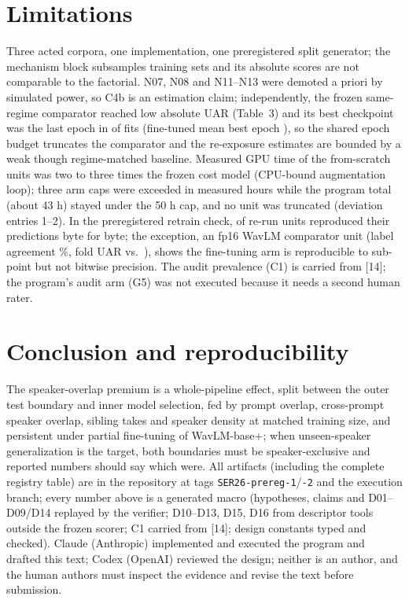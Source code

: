 \documentclass{article}
\begin{document}
\section{Limitations}
Three acted corpora, one implementation, one preregistered split generator; the mechanism block subsamples training sets and its absolute scores are not comparable to the factorial.
N07, N08 and N11--N13 were demoted a priori by simulated power, so C4b is an estimation claim; independently, the frozen same-regime comparator reached low absolute UAR (Table~3) and its best checkpoint was the last epoch in \DFtFrozenBestLast{} of \DFtFrozenTotal{} fits (fine-tuned mean best epoch \DFtFtMeanBest), so the shared epoch budget truncates the comparator and the re-exposure estimates are bounded by a weak though regime-matched baseline.
Measured GPU time of the from-scratch units was two to three times the frozen cost model (CPU-bound augmentation loop); three arm caps were exceeded in measured hours while the program total (about 43 h) stayed under the 50 h cap, and no unit was truncated (deviation entries 1--2).
In the preregistered retrain check, \DRetrainIdentical{} of \DRetrainTotal{} re-run units reproduced their predictions byte for byte; the exception, an fp16 WavLM comparator unit (label agreement \DRetrainAgree\%, fold UAR \DRetrainUarMain{} vs.\ \DRetrainUarCheck), shows the fine-tuning arm is reproducible to sub-point but not bitwise precision.
The audit prevalence (C1) is carried from [14]; the program's audit arm (G5) was not executed because it needs a second human rater.

\section{Conclusion and reproducibility}
The speaker-overlap premium is a whole-pipeline effect, split between the outer test boundary and inner model selection, fed by prompt overlap, cross-prompt speaker overlap, sibling takes and speaker density at matched training size, and persistent under partial fine-tuning of WavLM-base+; when unseen-speaker generalization is the target, both boundaries must be speaker-exclusive and reported numbers should say which were.
All artifacts (including the complete registry table) are in the repository at tags \texttt{SER26-prereg-1}/\texttt{-2} and the execution branch; every number above is a generated macro (hypotheses, claims and D01--D09/D14 replayed by the verifier; D10--D13, D15, D16 from descriptor tools outside the frozen scorer; C1 carried from [14]; design constants typed and checked).
Claude (Anthropic) implemented and executed the program and drafted this text; Codex (OpenAI) reviewed the design; neither is an author, and the human authors must inspect the evidence and revise the text before submission.
\end{document}
